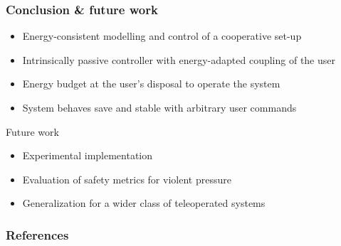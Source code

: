 \documentclass[student]{ITRslides}
\begin{document}
\begin{frame}
	\frametitle{Conclusion \& future work}
	\begin{itemize}
		\item Energy-consistent modelling and control of a cooperative set-up
		\item Intrinsically passive controller with energy-adapted coupling of the user
		\item Energy budget at the user's disposal to operate the system
		\item System behaves save and stable with arbitrary user commands

  
	\end{itemize}
		\begin{block}{Future work}
\begin{itemize}
\item Experimental implementation
\item Evaluation of safety metrics for violent pressure
\item Generalization for a wider class of teleoperated systems
\end{itemize}
	\end{block}	
\end{frame}
\appendix
\begin{frame}[allowframebreaks]
	\frametitle{References}
	\printbibliography
\end{frame}
\end{document}
